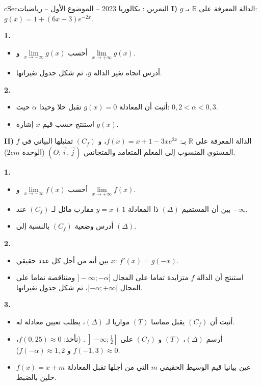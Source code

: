 \documentclass[12pt,a4paper]{article}
\newenvironment{BOX}[2]{\begin{otherlanguage}{english}\begin{arbox}{#1}{#2}}{\end{arbox}\end{otherlanguage}}
\newcounter{exo}
\newenvironment{tamrin}[1]{\stepcounter{exo}\begin{BOX}{cSec}{التمرين \theexo: #1}}{\end{BOX}}
\newcommand{\R}{\mathbb{R}}
\newenvironment{sq}{\begin{itemize}[leftmargin=2.4em,itemsep=3pt]}{\end{itemize}}
\newcommand{\qa}{\item[(أ)]}\newcommand{\qb}{\item[(ب)]}\newcommand{\qc}{\item[(جـ)]}\newcommand{\qd}{\item[(د)]}\newcommand{\qe}{\item[(هـ)]}
\newcommand{\QQ}[1]{\par\smallskip\textbf{#1.} }
\begin{document}
\begin{tamrin}{بكالوريا 2023 -- الموضوع الأول -- رياضيات}
\textbf{I)} $g$ الدالة المعرفة على $\R$ بـ: $g(x)=1+(6x-3)e^{-2x}$.
\QQ{1}
\begin{sq}
\qa أحسب $\lim\limits_{x\to-\infty}g(x)$ و $\lim\limits_{x\to+\infty}g(x)$.
\qb أدرس اتجاه تغير الدالة $g$، ثم شكل جدول تغيراتها.
\end{sq}
\QQ{2}
\begin{sq}
\qa أثبت أن المعادلة $g(x)=0$ تقبل حلا وحيدا $\alpha$ حيث: $0{,}2<\alpha<0{,}3$.
\qb استنتج حسب قيم $x$ إشارة $g(x)$.
\end{sq}

\textbf{II)} $f$ الدالة المعرفة على $\R$ بـ: $f(x)=x+1-3xe^{2x}$، و $(C_f)$ تمثيلها البياني في المستوي المنسوب إلى المعلم المتعامد والمتجانس $(O;\vec i,\vec j)$ (الوحدة $2cm$).
\QQ{1}
\begin{sq}
\qa أحسب $\lim\limits_{x\to-\infty}f(x)$ و $\lim\limits_{x\to+\infty}f(x)$.
\qb بين أن المستقيم $(\Delta)$ ذا المعادلة $y=x+1$ مقارب مائل لـ $(C_f)$ عند $-\infty$.
\qc أدرس وضعية $(C_f)$ بالنسبة إلى $(\Delta)$.
\end{sq}
\QQ{2}
\begin{sq}
\qa بين أنه من أجل كل عدد حقيقي $x$: $f'(x)=g(-x)$.
\qb استنتج أن الدالة $f$ متزايدة تماما على المجال $]{-}\infty;-\alpha]$ ومتناقصة تماما على المجال $[-\alpha;+\infty[$، ثم شكل جدول تغيراتها.
\end{sq}
\QQ{3}
\begin{sq}
\qa أثبت أن $(C_f)$ يقبل مماسا $(T)$ موازيا لـ $(\Delta)$، يطلب تعيين معادلة له.
\qb أرسم $(\Delta)$، $(T)$ و $(C_f)$ على $\left]{-}\infty;\frac12\right]$. (نأخذ: $f(0{,}25)\approx0$، $f(-1{,}3)\approx0$ و $f(-\alpha)\approx1{,}2$).
\qc عين بيانيا قيم الوسيط الحقيقي $m$ التي من أجلها تقبل المعادلة $f(x)=x+m$ حلين بالضبط.
\end{sq}
\end{tamrin}
\end{document}
